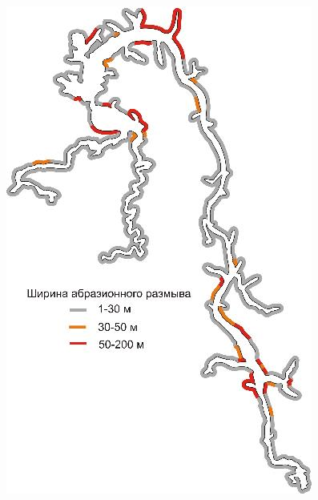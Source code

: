 \documentclass[10pt]{beamer}
\begin{document}
\begin{frame}[fragile]
\begin{columns}
\begin{column}{0.5\linewidth}
      \includegraphics[width=\linewidth]{bratsk-reserv-shores.jpeg}
    \end{column}
  \end{columns}
\end{frame}
\end{document}
